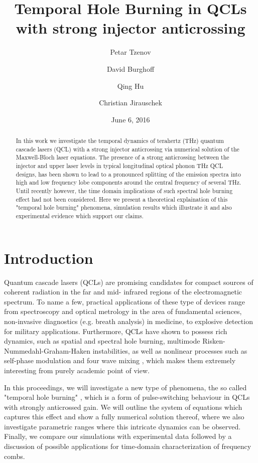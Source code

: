 \documentclass[]{spie}  %
\title{Temporal Hole Burning in QCLs with strong injector anticrossing}
\author[a]{Petar Tzenov}
\author[b]{David Burghoff}
\author[b]{Qing Hu}
\author[a]{Christian Jirauschek}
\affil[a]{Institute for Nanoelectronics, Technical University of Munich, D-80333 Munich, Germany}
\affil[b]{Department of Electrical Engineering and Computer Science, Research Laboratory of Electronics, Massachusetts Institute of Technology, Cambridge, Massachusetts 02139, USA}
\date{June 6, 2016}%
\begin{document}
 
\maketitle


\begin{abstract}
In this work we investigate the temporal dynamics of terahertz (THz) quantum cascade lasers (QCL) with a strong injector anticrossing via numerical solution of the Maxwell-Bloch laser equations.
The presence of a strong anticrossing between the injector and upper laser levels in typical longitudinal optical phonon THz QCL designs, has been shown to lead to a pronounced splitting of the emission spectra into high and low frequency lobe components around the central frequency of several THz. Until recently however, the time domain implications of such spectral hole burning effect had not been considered. Here we present a theoretical explaination of this "temporal hole burning" phenomena, simulation results which illustrate it and also experimental evidence which support our claims. 
\end{abstract}


\section{Introduction}
Quantum cascade lasers (QCLs) are promising candidates for compact sources of coherent radiation in the far and mid- infrared regions of the electromagnetic spectrum. To name a few, practical applications of these type of devices range from spectroscopy and optical metrology in the area of fundamental sciences, non-invasive diagnostics (e.g. breath analysis) in medicine, to explosive detection for military applications. Furthermore, QCLs have shown to possess rich dynamics, such as spatial\cite{gordon2008multimode} and spectral\cite{burghoff2014terahertz} hole burning, multimode Risken-Nummedahl-Graham-Haken \cite{risken1968self,gordon2008multimode} instabilities,  as well as nonlinear processes such as self-phase modulation and four wave mixing \cite{friedli2013four,khurgin2014coherent}, which makes them extremely interesting from purely academic point of view.

In this proceedings, we will investigate a new type of phenomena, the so called "temporal hole burning" \cite{burghoff2015evaluating}, which is a form of pulse-switching behaviour in QCLs with strongly anticrossed gain. We will outline the system of equations which captures this effect and show a fully numerical solution thereof, where we also investigate parametric ranges where this intricate dynamics can be observed. Finally, we compare our simulations with experimental data followed by a discussion of possible applications for time-domain characterization of frequency combs.
\end{document}
